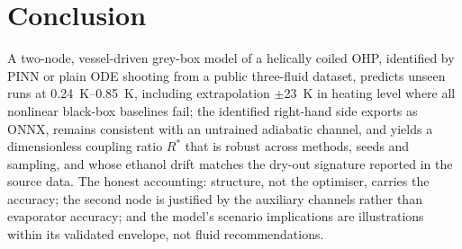 \section{Conclusion}
A two-node, vessel-driven grey-box model of a helically coiled OHP, identified by PINN or plain ODE shooting from a
public three-fluid dataset, predicts unseen runs at \SIrange{0.24}{0.85}{\kelvin}, including extrapolation
$\pm$\SI{23}{\kelvin} in heating level where all nonlinear black-box baselines fail; the identified right-hand side
exports as ONNX, remains consistent with an untrained adiabatic channel, and yields a dimensionless coupling ratio
$R^*$ that is robust across methods, seeds and sampling, and whose ethanol drift matches the dry-out signature
reported in the source data. The honest accounting: structure, not the optimiser, carries the accuracy; the second
node is justified by the auxiliary channels rather than evaporator accuracy; and the model's scenario implications
are illustrations within its validated envelope, not fluid recommendations.
